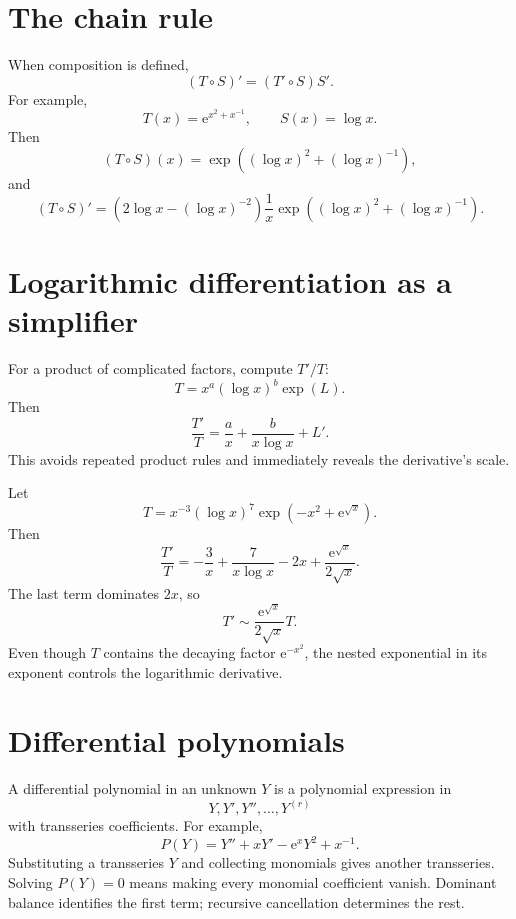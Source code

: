 \documentclass[11pt,openany]{book}
\theoremstyle{definition}
\theoremstyle{plain}
\theoremstyle{remark}
\newcommand{\e}{\mathrm{e}}
\newcommand{\asym}{\sim}
\begin{document}
\section{The chain rule}

When composition is defined,
\begin{equation}\label{eq:formal-chain-rule}
 (T\circ S)'=(T'\circ S)S'.
\end{equation}
For example,
\[
 T(x)=\e^{x^2+x^{-1}},
 \qquad
 S(x)=\log x.
\]
Then
\[
 (T\circ S)(x)=
 \exp\!\left((\log x)^2+(\log x)^{-1}\right),
\]
and
\[
 (T\circ S)'=
 \left(2\log x-(\log x)^{-2}\right)\frac1x
 \exp\!\left((\log x)^2+(\log x)^{-1}\right).
\]

\section{Logarithmic differentiation as a simplifier}

For a product of complicated factors, compute $T'/T$:
\[
 T=x^a(\log x)^b\exp(L).
\]
Then
\begin{equation}\label{eq:general-log-derivative}
 \frac{T'}{T}=\frac{a}{x}+\frac{b}{x\log x}+L'.
\end{equation}
This avoids repeated product rules and immediately reveals the derivative's scale.

\begin{workedbox}
Let
\[
 T=x^{-3}(\log x)^7\exp\!\left(-x^2+\e^{\sqrt{x}}\right).
\]
Then
\[
 \frac{T'}T=-\frac3x+\frac7{x\log x}-2x
 +\frac{\e^{\sqrt{x}}}{2\sqrt{x}}.
\]
The last term dominates $2x$, so
\[
 T'\asym
 \frac{\e^{\sqrt{x}}}{2\sqrt{x}}T.
\]
Even though $T$ contains the decaying factor $\e^{-x^2}$, the nested exponential in its exponent controls the logarithmic derivative.
\end{workedbox}

\section{Differential polynomials}

A differential polynomial in an unknown $Y$ is a polynomial expression in
\[
 Y,Y',Y'',\ldots,Y^{(r)}
\]
with transseries coefficients. For example,
\[
 P(Y)=Y''+xY'-\e^xY^2+x^{-1}.
\]
Substituting a transseries $Y$ and collecting monomials gives another transseries. Solving $P(Y)=0$ means making every monomial coefficient vanish. Dominant balance identifies the first term; recursive cancellation determines the rest.
\end{document}
